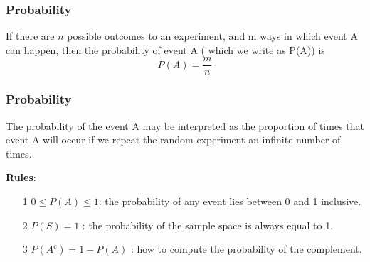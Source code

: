 \documentclass[IntroMain.tex]{subfiles}
\begin{document}
\begin{frame}
\frametitle{Probability}
\Large
If there are $n$ possible outcomes to an experiment, and m ways in which event
A can happen, then the probability of event A ( which we write as P(A)) is
\[ P(A) = \frac{m}{n} \]

\end{frame}
\begin{frame}
	\frametitle{Probability}
The probability of the event A may be interpreted as the proportion of times
that event A will occur if we repeat the random experiment an infinite number
of times.\\ \bigskip

\end{frame}
\begin{frame}
\textbf{Rules}:\\
\begin{itemize}
\item[1] $0 \leq P(A) \leq 1 $: the probability of any event lies between 0 and 1
inclusive.
\item[2] $P(S) = 1$ : the probability of the sample space is always equal to 1.
\item[3] $P(A^c) = 1-P(A)$ : how to compute the probability of the complement.
\end{itemize}
\end{frame}


\end{document}
